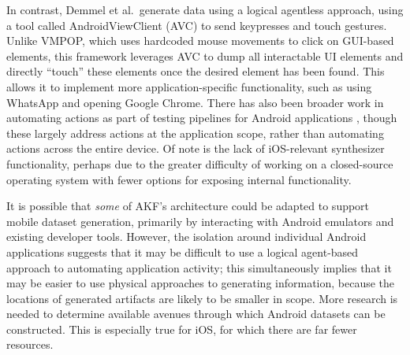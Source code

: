 In contrast, Demmel et al.~generate data using a logical agentless
approach, using a tool called AndroidViewClient (AVC) to send keypresses
and touch gestures. Unlike VMPOP, which uses hardcoded mouse movements
to click on GUI-based elements, this framework leverages AVC to dump all
interactable UI elements and directly ``touch'' these elements once the
desired element has been found. This allows it to implement more
application-specific functionality, such as using WhatsApp and opening
Google Chrome. There has also been broader work in automating actions as
part of testing pipelines for Android applications
\cite{janickiObstaclesOpportunitiesDeploying2012,nagowahNovelApproachAutomation2012,linares-vasquezHowDevelopersTest2017},
though these largely address actions at the application scope, rather
than automating actions across the entire device. Of note is the lack of
iOS-relevant synthesizer functionality, perhaps due to the greater
difficulty of working on a closed-source operating system with fewer
options for exposing internal functionality.

It is possible that \emph{some} of AKF's architecture could be adapted
to support mobile dataset generation, primarily by interacting with
Android emulators and existing developer tools. However, the isolation
around individual Android applications suggests that it may be difficult
to use a logical agent-based approach to automating application
activity; this simultaneously implies that it may be easier to use
physical approaches to generating information, because the locations of
generated artifacts are likely to be smaller in scope. More research is
needed to determine available avenues through which Android datasets can
be constructed. This is especially true for iOS, for which there are far
fewer resources.
